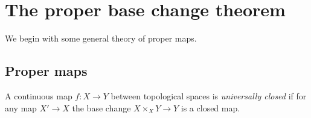 \chapter{The proper base change theorem}

We begin with some general theory of proper maps. 

\section{Proper maps}

\begin{defn}
	A continuous map $f: X \to Y$ between topological spaces is \emph{universally closed} if for any map $X' \to X$ the base change $X \times_X Y \to Y$ is a closed map.
\end{defn}


